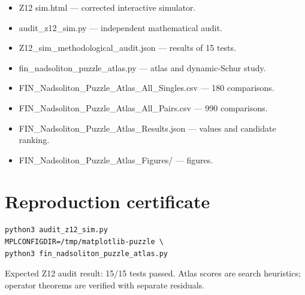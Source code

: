 \documentclass[11pt,a4paper,openany]{report}
\begin{document}
\begin{itemize}
\item 
Z12 sim.html --- corrected interactive simulator.

\item 
audit\_z12\_sim.py --- independent mathematical audit.

\item 
Z12\_sim\_methodological\_audit.json --- results of 15 tests.

\item 
fin\_nadsoliton\_puzzle\_atlas.py --- atlas and dynamic-Schur study.

\item 
FIN\_Nadsoliton\_Puzzle\_Atlas\_All\_Singles.csv --- 180 comparisons.

\item 
FIN\_Nadsoliton\_Puzzle\_Atlas\_All\_Pairs.csv --- 990 comparisons.

\item 
FIN\_Nadsoliton\_Puzzle\_Atlas\_Results.json --- values and candidate ranking.

\item 
FIN\_Nadsoliton\_Puzzle\_Atlas\_Figures/\allowbreak{} --- figures.

\end{itemize}


\clearpage
\chapter*{Reproduction certificate}
\begin{Verbatim}[fontsize=\small]
python3 audit_z12_sim.py
MPLCONFIGDIR=/tmp/matplotlib-puzzle \
python3 fin_nadsoliton_puzzle_atlas.py
\end{Verbatim}
Expected Z12 audit result: 15/15 tests passed. Atlas scores are search
heuristics; operator theorems are verified with separate residuals.
\end{document}
